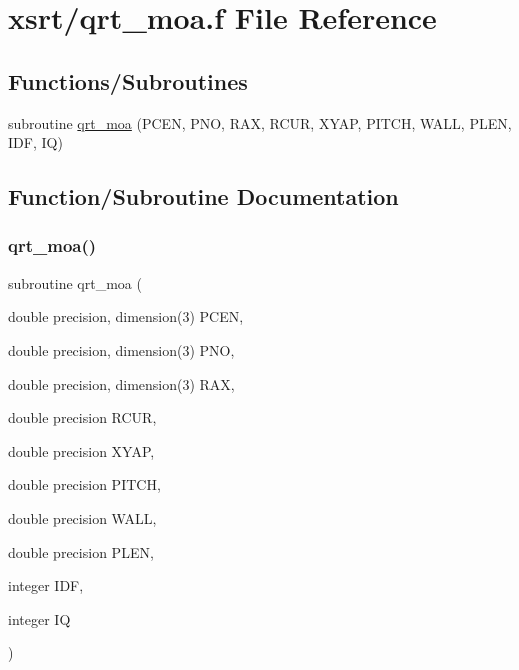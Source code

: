 \hypertarget{qrt__moa_8f}{}\section{xsrt/qrt\+\_\+moa.f File Reference}
\label{qrt__moa_8f}
\subsection*{Functions/\+Subroutines}
\begin{DoxyCompactItemize}
\item 
subroutine \hyperlink{qrt__moa_8f_acf35ec3fa54aacf4f01035a3e16ec05c}{qrt\+\_\+moa} (P\+C\+EN, P\+NO, R\+AX, R\+C\+UR, X\+Y\+AP, P\+I\+T\+CH, W\+A\+LL, P\+L\+EN, I\+DF, IQ)
\end{DoxyCompactItemize}


\subsection{Function/\+Subroutine Documentation}
\mbox{\label{qrt__moa_8f_acf35ec3fa54aacf4f01035a3e16ec05c}} 
\subsubsection{\texorpdfstring{qrt\+\_\+moa()}{qrt\_moa()}}
{\footnotesize\ttfamily subroutine qrt\+\_\+moa (\begin{DoxyParamCaption}\item[{double precision, dimension(3)}]{P\+C\+EN,  }\item[{double precision, dimension(3)}]{P\+NO,  }\item[{double precision, dimension(3)}]{R\+AX,  }\item[{double precision}]{R\+C\+UR,  }\item[{double precision}]{X\+Y\+AP,  }\item[{double precision}]{P\+I\+T\+CH,  }\item[{double precision}]{W\+A\+LL,  }\item[{double precision}]{P\+L\+EN,  }\item[{integer}]{I\+DF,  }\item[{integer}]{IQ }\end{DoxyParamCaption})}

